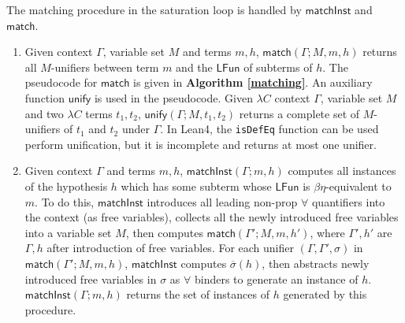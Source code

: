 The matching procedure in the saturation loop is handled by $\mathsf{matchInst}$ and $\mathsf{match}$.
\begin{enumerate}
  \item Given context $\Gamma$, variable set $M$ and terms $m, h$,
    $\mathsf{match}(\Gamma; M, m, h)$ returns all $M$-unifiers between term $m$ and the $\mathsf{LFun}$ of subterms of $h$.
    The pseudocode for $\mathsf{match}$ is given in \textbf{Algorithm \ref{matching}}. An auxiliary function
    $\mathsf{unify}$ is used in the pseudocode. Given $\lambda C$ context $\Gamma$, variable set $M$
    and two $\lambda C$ terms $t_1, t_2$, $\mathsf{unify}(\Gamma; M, t_1, t_2)$ returns a complete set of
    $M$-unifiers of $t_1$ and $t_2$ under $\Gamma$. In Lean4, the \texttt{isDefEq} function can be used perform
    unification, but it is incomplete and returns at most one unifier.
  \item Given context $\Gamma$ and terms $m, h$,
    $\mathsf{matchInst}(\Gamma; m, h)$ computes all instances of the hypothesis $h$ which has some subterm whose
    $\mathsf{LFun}$ is $\beta\eta$-equivalent to $m$. To do this, $\mathsf{matchInst}$ introduces all leading non-prop $\forall$
    quantifiers into the context (as free variables), collects all the newly introduced free variables into a variable set $M$,
    then computes $\mathsf{match}(\Gamma'; M, m, h')$, where $\Gamma', h'$ are $\Gamma, h$ after introduction of free variables.
    For each unifier $(\Gamma, \Gamma', \sigma)$ in $\mathsf{match}(\Gamma'; M, m, h)$, $\mathsf{matchInst}$ computes $\overline{\sigma}(h)$,
    then abstracts newly introduced free variables in $\sigma$ as $\forall$ binders to generate an instance of $h$.
    $\mathsf{matchInst}(\Gamma; m, h)$ returns the set of instances of $h$ generated by this procedure. 
\end{enumerate}

